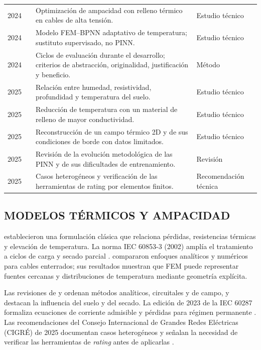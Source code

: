 \begin{longtable}{L{1.1cm}L{3.4cm}L{7.6cm}L{2.4cm}}
2024 & \textcite{atoccsa2024} & Optimización de ampacidad con relleno térmico en cables de alta tensión. & Estudio técnico \\
2024 & \textcite{aldulaimi2024} & Modelo FEM--BPNN adaptativo de temperatura; sustituto supervisado, no PINN. & Estudio técnico \\
2024 & \textcite{delport2024} & Ciclos de evaluación durante el desarrollo; criterios de abstracción, originalidad, justificación y beneficio. & Método \\
2025 & \textcite{khumalo2025} & Relación entre humedad, resistividad, profundidad y temperatura del suelo. & Estudio técnico \\
2025 & \textcite{kim2025} & Reducción de temperatura con un material de relleno de mayor conductividad. & Estudio técnico \\
2025 & \textcite{pan2025} & Reconstrucción de un campo térmico 2D y de sus condiciones de borde con datos limitados. & Estudio técnico \\
2025 & \textcite{ren2025} & Revisión de la evolución metodológica de las PINN y de sus dificultades de entrenamiento. & Revisión \\
2025 & \textcite{cigre2025} & Casos heterogéneos y verificación de las herramientas de rating por elementos finitos. & Recomendación técnica \\
\bottomrule
\end{longtable}\endgroup

\subsection{MODELOS TÉRMICOS Y AMPACIDAD}

\textcite[752--772]{neher1957} establecieron una formulación clásica que relaciona pérdidas, resistencias térmicas y elevación de temperatura. La norma IEC 60853-3 (2002) amplía el tratamiento a ciclos de carga y secado parcial \parencite[cláusulas~2--4]{iec60853}. \textcite[1387--1400]{aras2005} compararon enfoques analíticos y numéricos para cables enterrados; sus resultados muestran que FEM puede representar fuentes cercanas y distribuciones de temperatura mediante geometría explícita.

Las revisiones de \textcite[4,11,17]{enescu2020} y \textcite[3--6]{enescu2021} ordenan métodos analíticos, circuitales y de campo, y destacan la influencia del suelo y del secado. La edición de 2023 de la IEC 60287 formaliza ecuaciones de corriente admisible y pérdidas para régimen permanente \parencite[cláusulas~4--5]{iec60287}. Las recomendaciones del Consejo Internacional de Grandes Redes Eléctricas (CIGRÉ) de 2025 documentan casos heterogéneos y señalan la necesidad de verificar las herramientas de \textit{rating} antes de aplicarlas \parencite[3--4,41--42,93--99]{cigre2025}.

